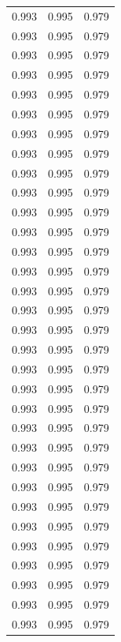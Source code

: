 \begin{tabular}{lrr}
0.993 & 0.995 & 0.979 \\
0.993 & 0.995 & 0.979 \\
0.993 & 0.995 & 0.979 \\
0.993 & 0.995 & 0.979 \\
0.993 & 0.995 & 0.979 \\
0.993 & 0.995 & 0.979 \\
0.993 & 0.995 & 0.979 \\
0.993 & 0.995 & 0.979 \\
0.993 & 0.995 & 0.979 \\
0.993 & 0.995 & 0.979 \\
0.993 & 0.995 & 0.979 \\
0.993 & 0.995 & 0.979 \\
0.993 & 0.995 & 0.979 \\
0.993 & 0.995 & 0.979 \\
0.993 & 0.995 & 0.979 \\
0.993 & 0.995 & 0.979 \\
0.993 & 0.995 & 0.979 \\
0.993 & 0.995 & 0.979 \\
0.993 & 0.995 & 0.979 \\
0.993 & 0.995 & 0.979 \\
0.993 & 0.995 & 0.979 \\
0.993 & 0.995 & 0.979 \\
0.993 & 0.995 & 0.979 \\
0.993 & 0.995 & 0.979 \\
0.993 & 0.995 & 0.979 \\
0.993 & 0.995 & 0.979 \\
0.993 & 0.995 & 0.979 \\
0.993 & 0.995 & 0.979 \\
0.993 & 0.995 & 0.979 \\
0.993 & 0.995 & 0.979 \\
0.993 & 0.995 & 0.979 \\
0.993 & 0.995 & 0.979 \\
\bottomrule
\end{tabular}

